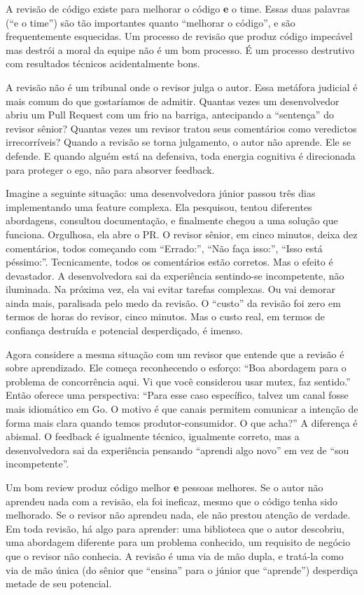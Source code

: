 A revisão de código existe para melhorar o código \textbf{e} o time. Essas duas
palavras (``e o time'') são tão importantes quanto ``melhorar o código'', e
são frequentemente esquecidas. Um processo de revisão que produz código impecável
mas destrói a moral da equipe não é um bom processo. É um processo destrutivo com
resultados técnicos acidentalmente bons.

A revisão não é um tribunal onde o revisor julga o autor. Essa metáfora judicial
é mais comum do que gostaríamos de admitir. Quantas vezes um desenvolvedor abriu
um Pull Request com um frio na barriga, antecipando a ``sentença'' do revisor
sênior? Quantas vezes um revisor tratou seus comentários como veredictos
irrecorríveis? Quando a revisão se torna julgamento, o autor não aprende. Ele se
defende. E quando alguém está na defensiva, toda energia cognitiva é direcionada
para proteger o ego, não para absorver feedback.

Imagine a seguinte situação: uma desenvolvedora júnior passou três dias implementando
uma feature complexa. Ela pesquisou, tentou diferentes abordagens, consultou
documentação, e finalmente chegou a uma solução que funciona. Orgulhosa, ela abre o
PR. O revisor sênior, em cinco minutos, deixa dez comentários, todos começando com
``Errado:'', ``Não faça isso:'', ``Isso está péssimo:''. Tecnicamente, todos os
comentários estão corretos. Mas o efeito é devastador. A desenvolvedora sai da
experiência sentindo-se incompetente, não iluminada. Na próxima vez, ela vai evitar
tarefas complexas. Ou vai demorar ainda mais, paralisada pelo medo da revisão. O
``custo'' da revisão foi zero em termos de horas do revisor, cinco minutos. Mas o
custo real, em termos de confiança destruída e potencial desperdiçado, é imenso.

Agora considere a mesma situação com um revisor que entende que a revisão é sobre
aprendizado. Ele começa reconhecendo o esforço: ``Boa abordagem para o problema de
concorrência aqui. Vi que você considerou usar mutex, faz sentido.'' Então
oferece uma perspectiva: ``Para esse caso específico, talvez um canal fosse mais
idiomático em Go. O motivo é que canais permitem comunicar a intenção de forma mais
clara quando temos produtor-consumidor. O que acha?'' A diferença é abismal. O
feedback é igualmente técnico, igualmente correto, mas a desenvolvedora sai da
experiência pensando ``aprendi algo novo'' em vez de ``sou incompetente''.

Um bom review produz código melhor \textbf{e} pessoas melhores. Se o autor não
aprendeu nada com a revisão, ela foi ineficaz, mesmo que o código tenha sido
melhorado. Se o revisor não aprendeu nada, ele não prestou atenção de verdade. Em
toda revisão, há algo para aprender: uma biblioteca que o autor descobriu, uma
abordagem diferente para um problema conhecido, um requisito de negócio que o
revisor não conhecia. A revisão é uma via de mão dupla, e tratá-la como via de mão
única (do sênior que ``ensina'' para o júnior que ``aprende'') desperdiça
metade de seu potencial.

